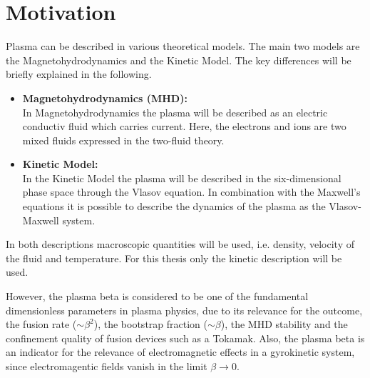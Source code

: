 
\NewPage
\chapter{Motivation}
\label{chap:motivation}

\thispagestyle{empty}
\newpage

Plasma can be described in various theoretical models. The main two models are the Magnetohydrodynamics and the Kinetic Model. The key differences will be briefly explained in the following.
\begin{itemize}
    \item \textbf{Magnetohydrodynamics (MHD):}\\
        In Magnetohydrodynamics the plasma will be described as an electric conductiv fluid which carries current. Here, the electrons and ions are two mixed fluids expressed in the two-fluid theory. 
    \item \textbf{Kinetic Model:}\\
        In the Kinetic Model the plasma will be described in the six-dimensional phase space through the Vlasov equation. In combination with the Maxwell's equations it is possible to describe the dynamics of the plasma as the Vlasov-Maxwell system. 
\end{itemize}
In both descriptions macroscopic quantities will be used, i.e. density, velocity of the fluid and temperature. For this thesis only the kinetic description will be used.

However, the plasma beta is considered to be one of the fundamental dimensionless parameters in plasma physics, due to its relevance for the outcome, the fusion rate ($\sim \beta^2$), the bootstrap fraction ($\sim \beta$), the MHD stability and the confinement quality of fusion devices such as a Tokamak. Also, the plasma beta is an indicator for the relevance of electromagnetic effects in a gyrokinetic system, since electromagentic fields vanish in the limit $\beta \rightarrow 0$. \bigskip

